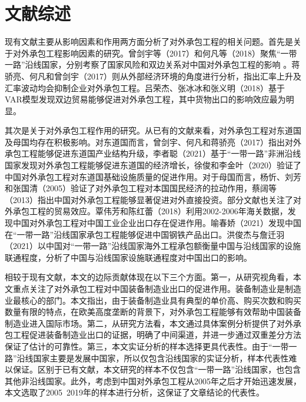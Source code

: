 \documentclass[a4paper,12pt]{article}
\newcommand{\upcite}[1]{\textsuperscript{\textsuperscript{\cite{#1}}}}
\begin{document}
\section{文献综述}

现有文献主要从影响因素和作用两方面分析了对外承包工程的相关问题。首先是关于对外承包工程影响因素的研究。曾剑宇等（2017）和何凡等（2018）聚焦“一带一路”沿线国家，分别考察了国家风险和双边关系对中国对外承包工程的影响\upcite{ref1} \upcite{ref2}。蒋骄亮、何凡和曾剑宇（2017）则从外部经济环境的角度进行分析，指出汇率上升及汇率波动均会抑制企业对外承包工程\upcite{ref3}。吕荣杰、张冰冰和张义明（2018）基于VAR模型发现双边贸易能够促进对外承包工程，其中货物出口的影响效应最为明显\upcite{ref4}。

	\vspace{0.5em}  %
	
其次是关于对外承包工程作用的研究。从已有的文献来看，对外承包工程对东道国及母国均存在积极影响。对东道国而言，曾剑宇、何凡和蒋骄亮（2017）指出对外承包工程能够促进东道国产业结构升级\upcite{ref5}，李者聪（2021）基于“一带一路”非洲沿线国家发现对外承包工程能够促进东道国的经济增长\upcite{ref6}，徐俊和李金叶（2020）验证了中国对外承包工程对东道国基础设施质量的促进作用\upcite{ref7}。对于母国而言，杨忻、刘芳和张国清（2005）验证了对外承包工程对本国国民经济的拉动作用\upcite{ref8}，蔡阔等（2013）指出中国对外承包工程能够显著促进对外直接投资\upcite{ref9}。部分文献也关注了对外承包工程的贸易效应。覃伟芳和陈红蕾（2018）利用2002-2006年海关数据，发现中国对外承包工程对中国工业企业出口存在促进作用\upcite{ref10}。喻春娇（2021）发现中国在“一带一路”沿线国家承包工程能够促进中国钢铁产品出口\upcite{ref11}。洪俊杰与詹迁羽（2021）以中国对“一带一路”沿线国家海外工程承包额衡量中国与沿线国家的设施联通程度，分析了中国与沿线国家设施联通程度对中国出口的影响\upcite{ref12}。

	\vspace{0.5em}  %

相较于现有文献，本文的边际贡献体现在以下三个方面。第一，从研究视角看，本文重点关注了对外承包工程对中国装备制造业出口的促进作用。装备制造业是制造业最核心的部门。本文指出，由于装备制造业具有典型的单价高、购买次数和购买数量有限的特点，在欧美高度垄断的背景下，对外承包工程能够有效帮助中国装备制造业进入国际市场。第二，从研究方法看，本文通过具体案例分析提供了对外承包工程促进装备制造业出口的证据，明确了中间渠道，并进一步通过双重差分方法保证了估计的可靠性。第三，本文实证分析的样本选择更具代表性。由于“一带一路”沿线国家主要是发展中国家，所以仅包含沿线国家的实证分析，样本代表性难以保证。区别于已有文献，本文研究的样本不仅包含“一带一路”沿线国家，也包含其他非沿线国家。此外，考虑到中国对外承包工程从2005年之后才开始迅速发展，本文选取了2005~2019年的样本进行分析，这保证了文章结论的代表性。
\end{document}
